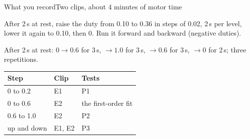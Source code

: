 %
\begin{frame}{What you record}{Two clips, about 4 minutes of motor time}
  \footnotesize
  \begin{description}\setlength{\itemsep}{4pt}
    \item[\textbf{E1, small duty}] After 2\,s at rest, raise the duty from 0.10 to 0.36 in steps of 0.02, 2\,s per level, lower it again to 0.10, then 0.
      Run it forward and backward (negative duties).
    \item[\textbf{E2, operating point}] After 2\,s at rest: $0 \to 0.6$ for 3\,s, $\to 1.0$ for 3\,s, $\to 0.6$ for 3\,s, $\to 0$ for 2\,s; three repetitions.
  \end{description}
  \vspace{4pt}
  \begin{center}
  \begin{tabular}{@{}lll@{}}
    \toprule
    Step & Clip & Tests \\
    \midrule
    0 to 0.2 & E1 & P1 \\
    0 to 0.6 & E2 & the first-order fit \\
    0.6 to 1.0 & E2 & P2 \\
    up and down & E1, E2 & P3 \\
    \bottomrule
  \end{tabular}
  \end{center}
\end{frame}
